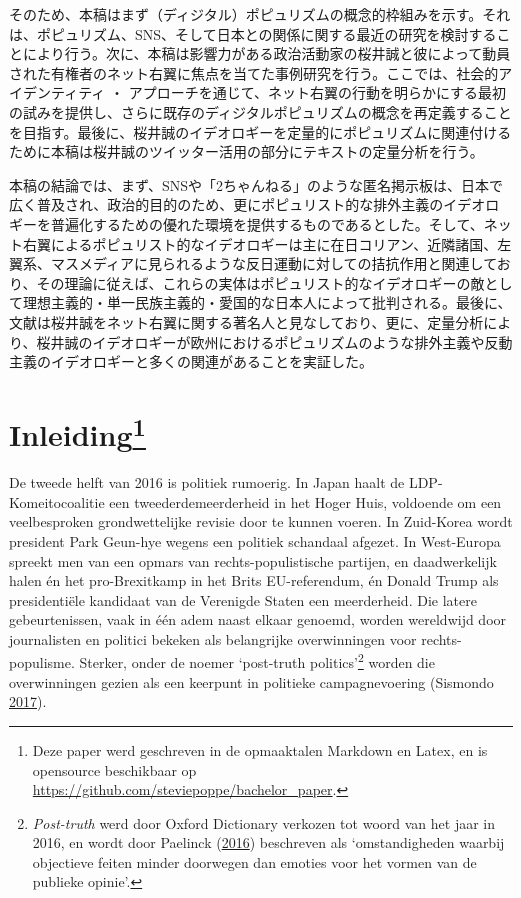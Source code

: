 \documentclass[10.5pt,dutch,]{article}
\begin{document}
そのため、本稿はまず（ディジタル）ポピュリズムの概念的枠組みを示す。それは、ポピュリズム、SNS、そして日本との関係に関する最近の研究を検討することにより行う。次に、本稿は影響力がある政治活動家の桜井誠と彼によって動員された有権者のネット右翼に焦点を当てた事例研究を行う。ここでは、社会的アイデンティティ
・
アプローチを通じて、ネット右翼の行動を明らかにする最初の試みを提供し、さらに既存のディジタルポピュリズムの概念を再定義することを目指す。最後に、桜井誠のイデオロギーを定量的にポピュリズムに関連付けるために本稿は桜井誠のツイッター活用の部分にテキストの定量分析を行う。

本稿の結論では、まず、SNSや「2ちゃんねる」のような匿名掲示板は、日本で広く普及され、政治的目的のため、更にポピュリスト的な排外主義のイデオロギーを普遍化するための優れた環境を提供するものであるとした。そして、ネット右翼によるポピュリスト的なイデオロギーは主に在日コリアン、近隣諸国、左翼系、マスメディアに見られるような反日運動に対しての拮抗作用と関連しており、その理論に従えば、これらの実体はポピュリスト的なイデオロギーの敵として理想主義的・単一民族主義的・愛国的な日本人によって批判される。最後に、文献は桜井誠をネット右翼に関する著名人と見なしており、更に、定量分析により、桜井誠のイデオロギーが欧州におけるポピュリズムのような排外主義や反動主義のイデオロギーと多くの関連があることを実証した。

\newpage

\section[Inleiding]{\texorpdfstring{Inleiding\footnote{Deze paper werd
  geschreven in de opmaaktalen Markdown en Latex, en is opensource
  beschikbaar op \url{https://github.com/steviepoppe/bachelor_paper}.}}{Inleiding}}\label{inleiding75}

De tweede helft van 2016 is politiek rumoerig. In Japan haalt de
LDP-Komeitocoalitie een tweederdemeerderheid in het Hoger Huis,
voldoende om een veelbesproken grondwettelijke revisie door te kunnen
voeren. In Zuid-Korea wordt president Park Geun-hye wegens een politiek
schandaal afgezet. In West-Europa spreekt men van een opmars van
rechts-populistische partijen, en daadwerkelijk halen én het
pro-Brexitkamp in het Brits EU-referendum, én Donald Trump als
presidentiële kandidaat van de Verenigde Staten een meerderheid. Die
latere gebeurtenissen, vaak in één adem naast elkaar genoemd, worden
wereldwijd door journalisten en politici bekeken als belangrijke
overwinningen voor rechts-populisme. Sterker, onder de noemer
`post-truth politics'\footnote{\emph{Post-truth} werd door Oxford
  Dictionary verkozen tot woord van het jaar in 2016, en wordt door
  Paelinck
  (\protect\hyperlink{ref-paelinckux5fpost-truthux5f2016}{2016})
  beschreven als `omstandigheden waarbij objectieve feiten minder
  doorwegen dan emoties voor het vormen van de publieke opinie'.} worden
die overwinningen gezien als een keerpunt in politieke campagnevoering
(Sismondo
\protect\hyperlink{ref-sismondoux5fpost-truthux3fux5f2017}{2017}).
\end{document}
